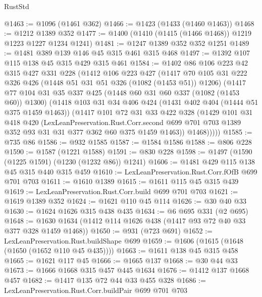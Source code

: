 \begin{lexlean}{RustStd}
\begin{coremodule}
@1463 := @1096 (@1461 @362)
@1466 := @1423 (@1433 (@1460 @1463))
@1468 := @1212 @1389 @352
@1477 := @1400 (@1410 (@1415 (@1466 @1468)) @1219 @1223 @1227 @1234 @1241)
@1481 := @1247 @1389 @352 @352 @1251
@1489 := @1481 @389 @139 @146 @45 @315 @461 @315 @468
@1497 := @1392 @107 @115 @138 @45 @315 @429 @315 @461
@1584 := @1402
    @86
    @106
    @223
    @42
    @315
    @427
    @331
    @228
    (@1412
      @106
      @223
      @427
      (@1417
        @70
        @105
        @31
        @222
        @326
        @426
        (@1448 @51 @31 @51 @326 (@1082 (@1453 @51)) @1206)
        (@1417
          @77
          @104
          @31
          @35
          @337
          @425
          (@1448 @60 @31 @60 @337 (@1082 (@1453 @60)) @1300)
          (@1418
            @103
            @31
            @34
            @406
            @424
            (@1431 @402 @404 (@1444 @51 @375 @1459 @1463))
            (@1417
              @101
              @72
              @31
              @33
              @422
              @328
              (@1429
                @101
                @31
                @418
                @420
                (LexLeanPreservation.Rust.Corr.second
                  @699
                  @701
                  @703
                  @1389
                  @352
                  @93
                  @31
                  @31
                  @377
                  @362
                  @60
                  @375
                  @1459
                  @1463))
              @1468)))))
@1585 := @735 @86
@1586 := @932 @1585
@1587 := @1584 @1586
@1588 := @806 @228
@1590 := @1587 (@1221 @1588)
@1591 := @830 @228
@1598 := @1497 (@1590 (@1225 @1591) (@1230 (@1232 @86)) @1241)
@1606 := @1481 @429 @115 @138 @45 @315 @440 @315 @459
@1610 := LexLeanPreservation.Rust.Corr.fOfB @699 @701 @703
@1611 := @1610 @1389
@1615 := @1611 @115 @45 @315 @439
@1619 := LexLeanPreservation.Rust.Corr.build @699 @701 @703
@1621 := @1619 @1389 @352
@1624 := @1621 @110 @45 @114
@1626 := @30 @40 @33
@1630 := @1624 @1626 @315 @438 @435
@1634 := @6 @695 @331 (@2 @695)
@1648 := @1630 @1634 (@1412 @114 @1626 @438 (@1417 @93 @72 @40 @33 @377 @328 @1459 @1468))
@1650 := @931 (@723 @691)
@1652 := LexLeanPreservation.Rust.buildShape @699
@1659 := @1606 (@1615 (@1648 (@1650 (@1652 @110 @45 @435))))
@1663 := @1611 @138 @45 @315 @458
@1665 := @1621 @117 @45
@1666 := @1665 @137
@1668 := @30 @44 @33
@1673 := @1666 @1668 @315 @457 @445 @1634
@1676 := @1412 @137 @1668 @457
@1682 := @1417 @135 @72 @44 @33 @455 @328
@1686 := LexLeanPreservation.Rust.Corr.buildPair @699 @701 @703

\end{coremodule}
\end{lexlean}

